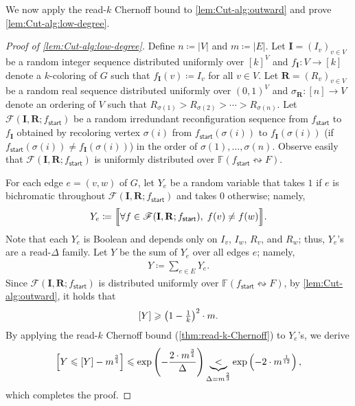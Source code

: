 \documentclass[11pt,fleqn]{article}
\renewcommand{\geq}{\geqslant}
\renewcommand{\leq}{\leqslant}
\renewcommand{\vec}[1]{\mathbf{#1}}
\newcommand{\reco}{\leftrightsquigarrow}
\newcommand{\defeq}{\coloneq}
\let\E\relax\DeclareMathOperator*{\E}{\mathbb{E}}  \let\Pr\relax\DeclareMathOperator*{\Pr}{\mathbb{Pr}}
\newcommand{\sss}{\mathsf{start}}
\newcommand{\f}{f}
\newcommand{\frnd}{F}
\newcommand{\sqcol}{\scrF}
\newcommand{\stsqcol}{\bbF}
\newcommand{\bbF}{\mathbb{F}}
\newcommand{\scrF}{\mathscr{F}}
\let\Pr\relax\DeclareMathOperator*{\Pr}{\mathbb{P}}
\theoremstyle{definition}
\numberwithin{equation}{section}
\begin{document}
We now apply the read-$k$ Chernoff bound to \cref{lem:Cut-alg:outward}
and prove \cref{lem:Cut-alg:low-degree}.


\begin{proof}[Proof of \cref{lem:Cut-alg:low-degree}]
Define $n \defeq |V|$ and $m \defeq |E|$.
Let
$\vec{I} = (I_v)_{v \in V}$
    be a random integer sequence distributed uniformly over $[k]^V$ and
$\f_\vec{I} \colon V \to [k]$
    denote a $k$-coloring of $G$ such that
    $\f_\vec{I}(v) \defeq I_v$ for all $v \in V$.
Let 
$\vec{R} = (R_v)_{v \in V}$
    be a random real sequence distributed uniformly over $(0,1)^V$ and
$\sigma_\vec{R} \colon [n] \to V$ denote an ordering of $V$ such that
    $R_{\sigma(1)} > R_{\sigma(2)} > \cdots > R_{\sigma(n)}$.
Let $\sqcol(\vec{I}, \vec{R}; \f_\sss)$ be
a random irredundant reconfiguration sequence from $\f_\sss$ to $\f_\vec{I}$
obtained by
recoloring vertex $\sigma(i)$ from 
$\f_\sss(\sigma(i))$ to $\f_\vec{I}(\sigma(i))$
(if $\f_\sss(\sigma(i)) \neq \f_\vec{I}(\sigma(i))$)
in the order of $\sigma(1), \ldots, \sigma(n)$.
Observe easily that $\sqcol(\vec{I}, \vec{R}; \f_\sss)$
is uniformly distributed over $\stsqcol(\f_\sss \reco \frnd)$.


For each edge $e = (v,w)$ of $G$,
let $Y_e$ be a random variable that takes $1$
if $e$ is bichromatic throughout $\sqcol(\vec{I}, \vec{R}; \f_\sss)$ and
takes $0$ otherwise; namely,
\begin{align}
    Y_e \defeq \Bigl\llbracket
        \forall \f \in \sqcol(\vec{I}, \vec{R}; \f_\sss), \;
        \f(v) \neq \f(w)
    \Bigr\rrbracket.
\end{align}
Note that each $Y_e$ is Boolean and depends only on $I_v$, $I_w$, $R_v$, and $R_w$;
thus, $Y_e$'s are a read-$\Delta$ family.
Let $Y$ be the sum of $Y_e$ over all edges $e$; namely,
\begin{align}
    Y \defeq \sum_{e \in E} Y_e.
\end{align}
Since $\sqcol(\vec{I}, \vec{R}; \f_\sss)$ is distributed uniformly over $\stsqcol(\f_\sss \reco \frnd)$,
by \cref{lem:Cut-alg:outward},
it holds that
\begin{align}
    \E[Y] \geq \left(1-\tfrac{1}{k}\right)^2 \cdot m.
\end{align}
By applying the read-$k$ Chernoff bound (\cref{thm:read-k-Chernoff}) to $Y_e$'s,
    we derive
\begin{align}
    \Pr\Bigl[Y \leq \E[Y] - m^{\frac{3}{4}}\Bigr]
    \leq \exp\left(-\frac{2\cdot m^{\frac{3}{4}}}{\Delta}\right)
    \underbrace{<}_{\Delta = m^\frac{2}{3}} \exp\left(-2\cdot m^\frac{1}{12}\right),
\end{align}
which completes the proof.
\end{proof}
\end{document}

